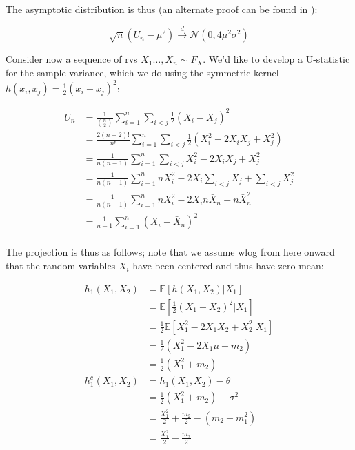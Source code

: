 \documentclass{report}
\begin{document}
The asymptotic distribution is thus (an alternate proof can be found in \cite[Chapter~5.5.2]{serfling_approximation_1980}):

\begin{equation}\label{eq:ex-lst-u-statistic-m2-asymptotics}
    \sqrt{n}(U_n - \mu^2) \overset{d}{\to} \mathcal{N}(0, 4\mu^2\sigma^2)
\end{equation}

Consider now a sequence of \glspl{rv} $X_1 \dots, X_n \sim F_X$. We'd like to develop a U-statistic for the sample variance, which we do using the symmetric kernel $h(x_i, x_j) = \frac{1}{2}(x_i - x_j)^2$:

\begin{equation}\label{eq:ex-lst-u-statistic-variance}
    \begin{aligned}
        U_n
          &= \frac{1}{\binom{n}{2}} \sum_{i=1}^n \sum_{i<j} \frac{1}{2} (X_i - X_j)^2 \\
          &= \frac{2(n-2)!}{n!} \sum_{i=1}^n \sum_{i<j} \frac{1}{2} \left(X_i^2 - 2X_iX_j + X_j^2\right) \\
          &= \frac{1}{n(n-1)} \sum_{i=1}^n \sum_{i<j} X_i^2 - 2X_iX_j + X_j^2 \\
          &= \frac{1}{n(n-1)} \sum_{i=1}^n nX_i^2 -2X_i\sum_{i<j}X_j + \sum_{i<j}X_j^2 \\
          &= \frac{1}{n(n-1)} \sum_{i=1}^n nX_i^2 -2X_in\bar{X}_n + n\bar{X}_n^2 \\
          &= \frac{1}{n-1} \sum_{i=1}^n \left(X_i - \bar{X}_n\right)^2 \\
    \end{aligned}
\end{equation}

The projection is thus as follows; note that we assume \gls{wlog} from here onward that the random variables $X_i$ have been centered and thus have zero mean:

\begin{equation}\label{eq:ex-lst-u-statistic-variance-projection}
    \begin{aligned}
        h_1(X_1, X_2)
          &= \mathbb{E}[h(X_1, X_2)|X_1] \\
          &= \mathbb{E}\left[\frac{1}{2}(X_1 - X_2)^2|X_1\right] \\
          &= \frac{1}{2}\mathbb{E}\left[X_1^2 - 2X_1X_2 + X_2^2|X_1\right] \\
          &= \frac{1}{2} (X_1^2 -2X_1\mu + m_2) \\
          &= \frac{1}{2} (X_1^2 + m_2) \\
        h_1^c(X_1, X_2)
          &= h_1(X_1, X_2) - \theta \\
          &= \frac{1}{2} (X_1^2 + m_2) - \sigma^2 \\
          &= \frac{X_1^2}{2} + \frac{m_2}{2} - (m_2 - m_1^2) \\
          &= \frac{X_1^2}{2} - \frac{m_2}{2} \\
    \end{aligned}
\end{equation}
\end{document}
